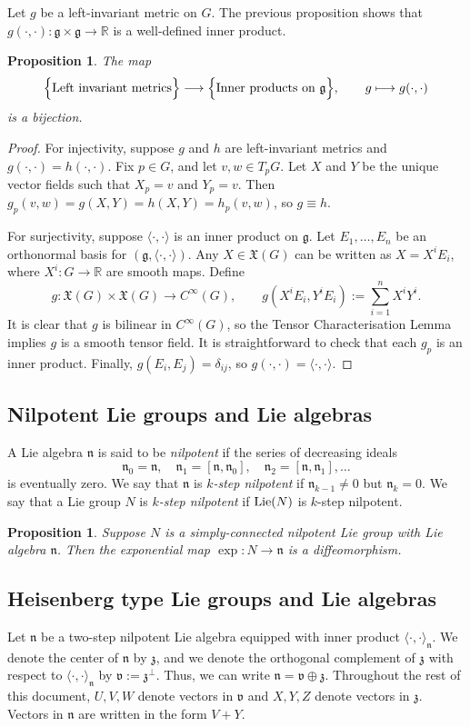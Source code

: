 \documentclass{amsart}
\newcommand{\R}{\mathbb R}
\newcommand{\lie}{\text{\normalfont Lie}}
\renewcommand{\v}{\mathfrak v}
\newcommand{\z}{\mathfrak z}
\newcommand{\n}{\mathfrak n}
\newcommand{\g}{\mathfrak g}
\theoremstyle{plain}
\newtheorem{proposition}[theorem]{Proposition}
\theoremstyle{definition}
\theoremstyle{remark}
\begin{document}
	Let $g$ be a left-invariant metric on $G$. The previous proposition shows that $g(\cdot,\cdot):\g \times \g \rightarrow \R$ is a well-defined inner product.
	\begin{proposition}
		The map 
		$$\Big\{\normalfont\text{Left invariant metrics}\Big\} \longrightarrow 
		\Big\{\normalfont\text{Inner products on $\g$}\Big\},\qquad g \longmapsto g(\cdot,\cdot)$$
		is a bijection.
	\end{proposition}
	\begin{proof}
		For injectivity, suppose $g$ and $h$ are left-invariant metrics and $g(\cdot,\cdot) = h(\cdot,\cdot)$. Fix $p \in G$, and let $v,w \in T_p G$. Let $X$ and $Y$ be the unique vector fields such that $X_p = v$ and $Y_p = v$. Then $g_p(v,w) = g(X,Y) = h(X,Y) = h_p(v,w)$, so $g \equiv h$.
		
		For surjectivity, suppose $\langle\cdot,\cdot \rangle$ is an inner product on $\g$. Let $E_1,\ldots, E_n$ be an orthonormal basis for $(\g, \langle \cdot, \cdot \rangle)$. Any $X \in \mathfrak X(G)$ can be written as $X = X^i E_i$, where $X^i:G \rightarrow \R$ are smooth maps. Define 
		$$g:\mathfrak X(G) \times \mathfrak X(G) \rightarrow C^\infty(G),\qquad g(X^i E_i, Y^i E_i) := \sum_{i=1}^n X^i Y^i.$$
		It is clear that $g$ is bilinear in $C^\infty(G)$, so the Tensor Characterisation Lemma implies $g$ is a smooth tensor field. It is straightforward to check that each $g_p$ is an inner product. Finally, $g(E_i, E_j) = \delta_{ij}$, so $g(\cdot,\cdot) = \langle \cdot, \cdot \rangle$.
	\end{proof}
	
	\subsection{Nilpotent Lie groups and Lie algebras}
	A Lie algebra $\n$ is said to be \emph{nilpotent} if the series of decreasing ideals 
	$$\n_0 = \n,\quad \n_1 = [\n,\n_0],\quad \n_2 = [\n,\n_1],\ldots$$
	is eventually zero. We say that $\n$ is \emph{$k$-step nilpotent} if $\n_{k-1}\neq 0$ but $\n_k = 0$. We say that a Lie group $N$ is \emph{$k$-step nilpotent} if $\lie(N)$ is $k$-step nilpotent.
	
	\begin{proposition}
		Suppose $N$ is a simply-connected nilpotent Lie group with Lie algebra $\n$. Then the exponential map $\exp: N \rightarrow \n$ is a diffeomorphism.
	\end{proposition}
	
	\subsection{Heisenberg type Lie groups and Lie algebras}
	Let $\n$ be a two-step nilpotent Lie algebra equipped with inner product $\langle \cdot ,\cdot \rangle_{\n}$. We denote the center of $\n$ by $\z$, and we denote the orthogonal complement of $\z$ with respect to $\langle \cdot ,\cdot \rangle_{\n}$ by $\v := \z^\perp$. Thus, we can write $\n = \v \oplus \z$.
	Throughout the rest of this document, $U,V,W$ denote vectors in $\v$ and $X,Y,Z$ denote vectors in $\z$. Vectors in $\n$ are written in the form $V+Y$.  
	
\end{document}
